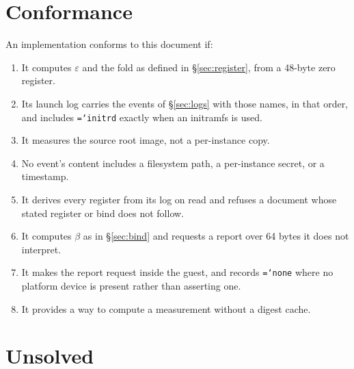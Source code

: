 \documentclass[11pt,a4paper]{article}
\newcommand{\code}[1]{\texttt{\hyphenchar\font=`\-\relax #1}}
\begin{document}
\section{Conformance}
\label{sec:conformance}

An implementation conforms to this document if:

\begin{enumerate}[label=C\arabic*.,leftmargin=2.5em]
\item It computes $\varepsilon$ and the fold as defined in \S\ref{sec:register},
  from a 48-byte zero register.
\item Its launch log carries the events of \S\ref{sec:logs} with those names, in
  that order, and includes \code{initrd} exactly when an initramfs is used.
\item It measures the source root image, not a per-instance copy.
\item No event's content includes a filesystem path, a per-instance secret, or a
  timestamp.
\item It derives every register from its log on read and refuses a document whose
  stated register or bind does not follow.
\item It computes $\beta$ as in \S\ref{sec:bind} and requests a report over 64
  bytes it does not interpret.
\item It makes the report request inside the guest, and records \code{none} where
  no platform device is present rather than asserting one.
\item It provides a way to compute a measurement without a digest cache.
\end{enumerate}

\section{Unsolved}
\label{sec:unsolved}
\end{document}
